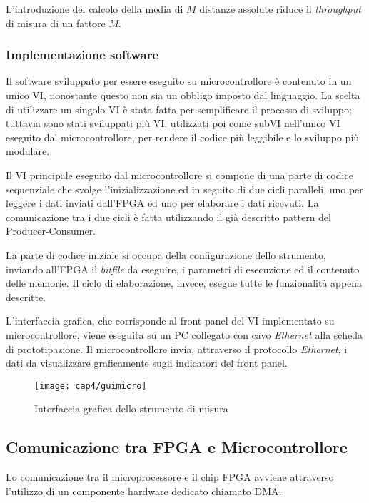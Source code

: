 L'introduzione del calcolo della media di $M$ distanze assolute riduce il \textit{throughput} di misura di un fattore $M$. 

\subsubsection{Implementazione software}
Il software sviluppato per essere eseguito su microcontrollore è contenuto in un unico VI, nonostante questo non sia un obbligo imposto dal linguaggio. La scelta di utilizzare un singolo VI è stata fatta per semplificare il processo di sviluppo; tuttavia sono stati sviluppati più VI, utilizzati poi come subVI nell'unico VI eseguito dal microcontrollore, per rendere il codice più leggibile e lo sviluppo più modulare.

Il VI principale eseguito dal microcontrollore si compone di una parte di codice sequenziale che svolge l'inizializzazione ed in seguito di due cicli paralleli, uno per leggere i dati inviati dall'FPGA ed uno per elaborare i dati ricevuti. La comunicazione tra i due cicli è fatta utilizzando il già descritto pattern del Producer-Consumer.

La parte di codice iniziale si occupa della configurazione dello strumento, inviando all'FPGA il \textit{bitfile} da eseguire, i parametri di esecuzione ed il contenuto delle memorie. Il ciclo di elaborazione, invece, esegue tutte le funzionalità appena descritte.

L'interfaccia grafica, che corrisponde al front panel del VI implementato su microcontrollore, viene eseguita su un PC collegato con cavo \textit{Ethernet} alla scheda di prototipazione. Il microcontrollore invia, attraverso il protocollo \textit{Ethernet}, i dati da visualizzare graficamente sugli indicatori del front panel.

\begin{figure}  
  \begin{center}
    \texttt{[image: cap4/guimicro]}
    \caption{Interfaccia grafica dello strumento di misura}
    \label{guimicro}
  \end{center}
\end{figure} 

\subsection{Comunicazione tra FPGA e Microcontrollore}
Lo comunicazione tra il microprocessore e il chip FPGA avviene attraverso l'utilizzo di un componente hardware dedicato chiamato DMA.


